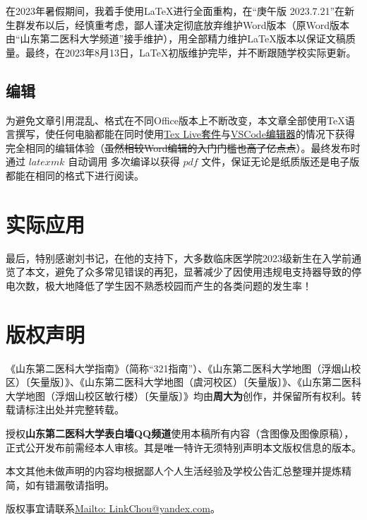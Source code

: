 在2023年暑假期间，我着手使用\LaTeX 进行全面重构，在“庚午版 2023.7.21”在新生群发布以后，经慎重考虑，鄙人谨决定彻底放弃维护Word版本（原Word版本由“山东第二医科大学频道”接手维护），用全部精力维护LaTeX版本以保证文稿质量。最终，在2023年8月13日，LaTeX初版维护完毕，并不断跟随学校实际更新。

\subsection[编辑]{编辑}
为避免文章引用混乱、格式在不同Office版本上不断改变，本文章全部使用\TeX 语言撰写，使任何电脑都能在同时使用\uline{\href{https://tug.org/texlive}{Tex Live套件}}与\uline{\href{https://code.visualstudio.com}{VSCode编辑器}}\footnotemark 的情况下获得完全相同的编辑体验（\sout{虽然相较Word编辑的入门门槛也高了亿点点}）。最终发布时通过 $latexmk$ 自动调用 \XeLaTeX 多次编译以获得 $pdf$ 文件，保证无论是纸质版还是电子版都能在相同的格式下进行阅读。

\section[实际应用]{实际应用}
最后，特别感谢刘书记，在他的支持下，大多数临床医学院2023级新生在入学前通览了本文，避免了众多常见错误的再犯，显著减少了因使用违规电支持器导致的停电次数，极大地降低了学生因不熟悉校园而产生的各类问题的发生率！

\section[版权声明]{版权声明}
\label{copyright}
《山东第二医科大学指南》（简称“321指南”）、《山东第二医科大学地图（浮烟山校区）〔矢量版〕》、《山东第二医科大学地图（虞河校区）〔矢量版〕》、《山东第二医科大学地图（浮烟山校区敏行楼）〔矢量版〕》均由\textbf{周大为}创作，并保留所有权利。转载请标注出处并完整转载。

授权\textbf{山东第二医科大学表白墙QQ频道}使用本稿所有内容（含图像及图像原稿），正式公开发布前需经本人审核。其是唯一特许无须特别声明本文版权信息的版本。

本文其他未做声明的内容均根据鄙人个人生活经验及学校公告汇总整理并提炼精简，如有错漏敬请指明。

版权事宜请联系\uline{\href{Mailto:LinkChou@yandex.com}{Mailto: LinkChou@yandex.com}}。
